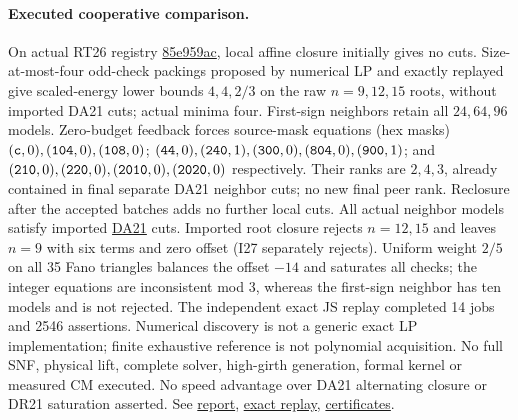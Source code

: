 \documentclass[11pt]{article}
\begin{document}
\paragraph{Executed cooperative comparison.}
On actual RT26 registry \href{https://github.com/j15marti/pnp/commit/85e959ac861572a2411b9858da0d58d7c72ac780}{85e959ac}, local affine closure initially gives no cuts. Size-at-most-four odd-check packings proposed by numerical LP and exactly replayed give scaled-energy lower bounds $4,4,2/3$ on the raw $n=9,12,15$ roots, without imported DA21 cuts; actual minima four. First-sign neighbors retain all $24,64,96$ models. Zero-budget feedback forces source-mask equations (hex masks) $({\tt c},0),({\tt104},0),({\tt108},0)$; $({\tt44},0),({\tt240},1),({\tt300},0),({\tt804},0),({\tt900},1)$; and $({\tt210},0),({\tt220},0),({\tt2010},0),({\tt2020},0)$ respectively. Their ranks are $2,4,3$, already contained in final separate DA21 neighbor cuts; no new final peer rank. Reclosure after the accepted batches adds no further local cuts. All actual neighbor models satisfy imported \href{https://github.com/j15marti/pnp/commit/6d9917749c8438435d889b31e5c81ed0fc410e9a}{DA21} cuts. Imported root closure rejects $n=12,15$ and leaves $n=9$ with six terms and zero offset (I27 separately rejects). Uniform weight $2/5$ on all 35 Fano triangles balances the offset $-14$ and saturates all checks; the integer equations are inconsistent mod 3, whereas the first-sign neighbor has ten models and is not rejected. The independent exact JS replay completed 14 jobs and 2546 assertions. Numerical discovery is not a generic exact LP implementation; finite exhaustive reference is not polynomial acquisition. No full SNF, physical lift, complete solver, high-girth generation, formal kernel or measured CM executed. No speed advantage over DA21 alternating closure or DR21 saturation asserted. See \href{https://github.com/j15marti/pnp/commit/baa4f349f0e05f64ad78c44ecd249ede7ea6d2b2}{report}, \href{https://github.com/j15marti/pnp/commit/9deefbbdf2e38ab2c02921d1af3fedb5d06596cf}{exact replay}, \href{https://github.com/j15marti/pnp/commit/0797b344ce2e25a612fb965c4dd524edd8dfb95b}{certificates}.
\end{document}
